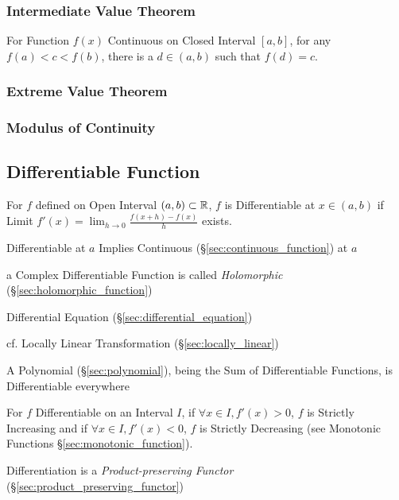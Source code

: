 \subsubsection{Intermediate Value Theorem}
\label{sec:intermediate_value}

For Function $f(x)$ Continuous on Closed Interval $[a,b]$, for any
$f(a) < c < f(b)$, there is a $d \in (a,b)$ such that $f(d) = c$.



\subsubsection{Extreme Value Theorem}\label{sec:extreme_value}

\subsubsection{Modulus of Continuity}\label{sec:continuity_modulus}



\subsection{Differentiable Function}\label{sec:differentiable_function}

For $f$ defined on Open Interval $(a,b) \subset \mathbb{R}$, $f$ is
Differentiable at $x \in (a,b)$ if Limit $f'(x) = \lim_{h \rightarrow
  0} \frac{f (x+h) - f(x)}{h}$ exists.

Differentiable at $a$ Implies Continuous (\S\ref{sec:continuous_function}) at
$a$

a Complex Differentiable Function is called \emph{Holomorphic}
(\S\ref{sec:holomorphic_function})

\fist Differential Equation (\S\ref{sec:differential_equation})

\fist cf. Locally Linear Transformation (\S\ref{sec:locally_linear})

A Polynomial (\S\ref{sec:polynomial}), being the Sum of Differentiable
Functions, is Differentiable everywhere

For $f$ Differentiable on an Interval $I$, if $\forall x \in I, f'(x)
> 0$, $f$ is Strictly Increasing and if $\forall x \in I, f'(x) < 0$,
$f$ is Strictly Decreasing (see Monotonic Functions
\S\ref{sec:monotonic_function}).

Differentiation is a \emph{Product-preserving Functor}
(\S\ref{sec:product_preserving_functor})

